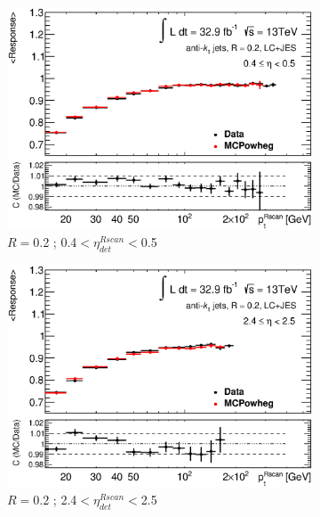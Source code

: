 \begin{figure}[ht]
    \centering
    \begin{subfigure}[b]{0.495\textwidth}
        \centering
        \includegraphics[width=\textwidth]{images/Closure2LC_49}
        \caption{$R=$0.2 ; 0.4$<\eta^{Rscan}_{det}<$0.5}
    \end{subfigure}
    \hfill
    \begin{subfigure}[b]{0.495\textwidth}
        \centering
        \includegraphics[width=\textwidth]{images/Closure2LC_69}
        \caption{$R=$0.2 ; 2.4$<\eta^{Rscan}_{det}<$2.5}
    \end{subfigure}
    \vfill
    \begin{subfigure}[b]{0.495\textwidth}

\end{subfigure}
\end{figure}
